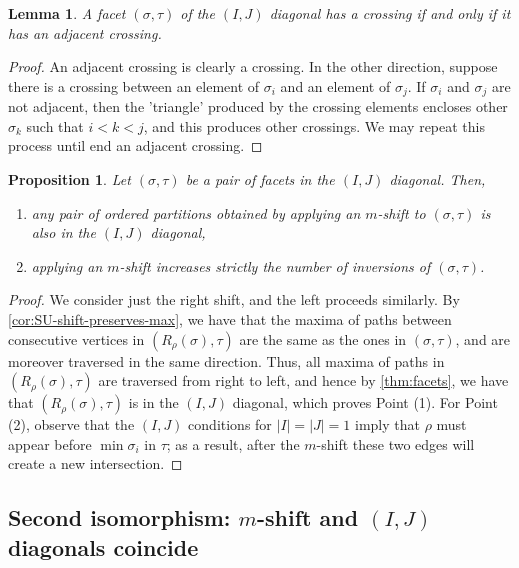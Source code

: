 \documentclass{amsart}
\newtheorem{proposition}[theorem]{Proposition}
\newtheorem{lemma}[theorem]{Lemma}
\theoremstyle{definition}
\begin{document}
\begin{lemma}
    \label{lem:adjacent-crossing}
A facet $(\sigma,\tau)$ of the $(I,J)$ diagonal has a crossing if and only if it has an adjacent crossing.
\end{lemma}

\begin{proof}
An adjacent crossing is clearly a crossing. In the other direction, suppose there is a crossing between an element of $\sigma_i$ and an element of $\sigma_j$. If $\sigma_i$ and $\sigma_j$ are not adjacent, then the 'triangle' produced by the crossing elements encloses other $\sigma_k$ such that $i<k<j$, and this produces other crossings. We may repeat this process until end an adjacent crossing.
\end{proof}

\begin{proposition} 
    \label{lem:IJ-closed-under-shifts}
    Let $(\sigma,\tau)$ be a pair of facets in the $(I,J)$ diagonal.
    Then,
    \begin{enumerate}
        \item any pair of ordered partitions obtained by applying an $m$-shift to $(\sigma,\tau)$ is also in the $(I,J)$ diagonal,
        \item applying an $m$-shift increases strictly the number of inversions of $(\sigma,\tau)$.
    \end{enumerate}
\end{proposition}

\begin{proof}
    We consider just the right shift, and the left proceeds similarly. 
    By \cref{cor:SU-shift-preserves-max}, we have that the maxima of paths between consecutive vertices in $(R_{\rho}(\sigma),\tau)$ are the same as the ones in $(\sigma,\tau)$, and are moreover traversed in the same direction.
    Thus, all maxima of paths in $(R_{\rho}(\sigma),\tau)$ are traversed from right to left, and hence by \cref{thm:facets}, we have that $(R_{\rho}(\sigma),\tau)$ is in the $(I,J)$ diagonal, which proves Point (1).
    For Point (2), observe that the $(I,J)$ conditions for $|I|=|J|=1$ imply that $\rho$ must appear before $\min \sigma_i$ in $\tau$; as a result, after the $m$-shift these two edges will create a new intersection.
\end{proof}


\subsection{Second isomorphism: $m$-shift and $(I,J)$ diagonals coincide}
\end{document}
